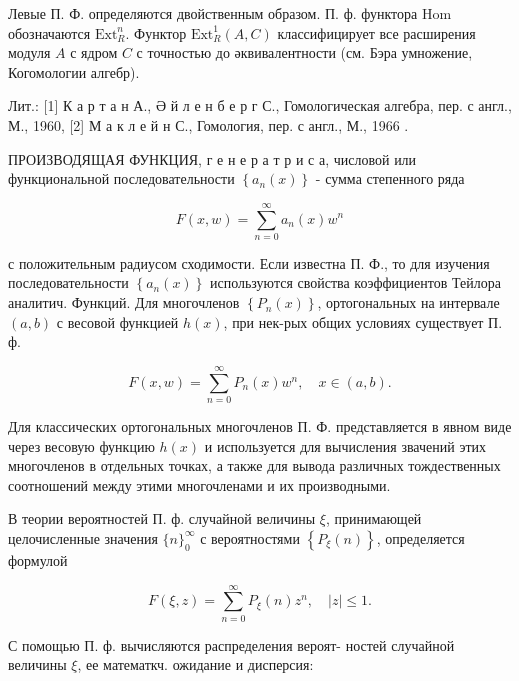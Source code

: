 \documentclass[10pt]{article}
\begin{document}
Левые П. Ф. определяются двойственным образом. П. ф. функтора Hom обозначаются $\mathrm{Ext}_{R}^{n}$. Функтор $\mathrm{Ext}_{R}^{1}(A, C)$ классифицирует все расширения модуля $A$ с ядром $C$ с точностью до әквивалентности (см. Бэра умножение, Когомологии алгебр).



Лит.: [1] К а р т а н А., Ә й л е н б е р г С., Гомологическая алгебра, пер. с англ., М., 1960, [2] М а к л е й н С., Гомология, пер. с англ., М., 1966 .



ПРОИЗВОДЯЩАЯ ФУНКЦИЯ, г е н е р а т р и с а, числовой или функциональной последовательности $\left\{a_{n}(x)\right\}$ - сумма степенного ряда



\[

F(x, w)=\sum_{n=0}^{\infty} a_{n}(x) w^{n}

\]



с положительным радиусом сходимости. Если известна П. Ф., то для изучения последовательности $\left\{a_{n}(x)\right\}$ используются свойства коэффициентов Тейлора аналитич. Функций. Для многочленов $\left\{P_{n}(x)\right\}$, ортогональных на интервале $(a, b)$ с весовой функцией $h(x)$, при нек-рых общих условиях существует П. ф.



\[

F(x, w)=\sum_{n=0}^{\infty} P_{n}(x) w^{n}, \quad x \in(a, b) .

\]



Для классических ортогональных многочленов П. Ф. представляется в явном виде через весовую функцию $h(x)$ и используется для вычисления звачений этих многочленов в отдельных точках, а также для вывода различных тождественных соотношений между этими многочленами и их производными.



В теории вероятностей П. ф. случайной величины $\xi$, принимающей целочисленные значения $\{n\}_{0}^{\infty}$ с вероятностями $\left\{P_{\xi}(n)\right\}$, определяется формулой



\[

F(\xi, z)=\sum_{n=0}^{\infty} P_{\xi}(n) z^{n}, \quad|z| \leqslant 1 .

\]



С помощью П. ф. вычисляются распределения вероят- ностей случайной величины $\xi$, ее математкч. ожидание и дисперсия:
\end{document}
